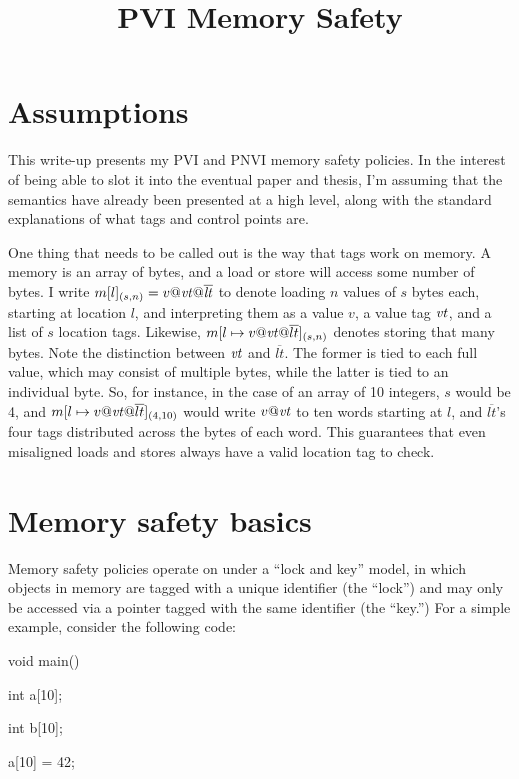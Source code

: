 \documentclass{article}
\title{PVI Memory Safety}
\begin{document}


\section{Assumptions}

This write-up presents my PVI and PNVI memory safety policies. In the interest of being able
to slot it into the eventual paper and thesis, I'm assuming that the semantics have already
been presented at a high level, along with the standard explanations of what tags and control
points are.

One thing that needs to be called out is the way that tags work on memory. A memory is an
array of bytes, and a load or store will access some number of bytes. I write
\(m[l]_{(s,n)} = v@\mathit{vt} @\overline{\mathit{lt}}\) to denote loading \(n\) values of \(s\) bytes each,
starting at location \(l\), and interpreting them as a value \(v\), a value tag \(\mathit{vt}\), and a list of
\(s\) location tags. Likewise, \(m[l \mapsto v@\mathit{vt} @ \overline{lt}]_{(s,n)}\)
denotes storing that many bytes. Note the distinction between \(\mathit{vt}\) and \(\overline{lt}\).
The former is tied to each full value, which may consist of multiple bytes, while the latter is tied
to an individual byte. So, for instance, in the case of an array of 10 integers, \(s\)
would be 4, and \(m[l \mapsto v@\mathit{vt} @ \overline{lt}]_{(4,10)}\) would write
\(v@\mathit{vt}\) to ten words starting at \(l\), and \(\overline{lt}\)'s four tags distributed across
the bytes of each word.
This guarantees that even misaligned loads and stores always have a valid location tag to check.

\section{Memory safety basics}

Memory safety policies operate on under a ``lock and key'' model, in which objects in memory
are tagged with a unique identifier (the ``lock'') and may only be accessed via a pointer tagged
with the same identifier (the ``key.'') For a simple example, consider the following code:

\vspace{\abovedisplayskip}
{\tt

  void main() {

    int a[10];
    
    int b[10];

    a[10] = 42;
    
  }

}
\vspace{\belowdisplayskip}
\end{document}
